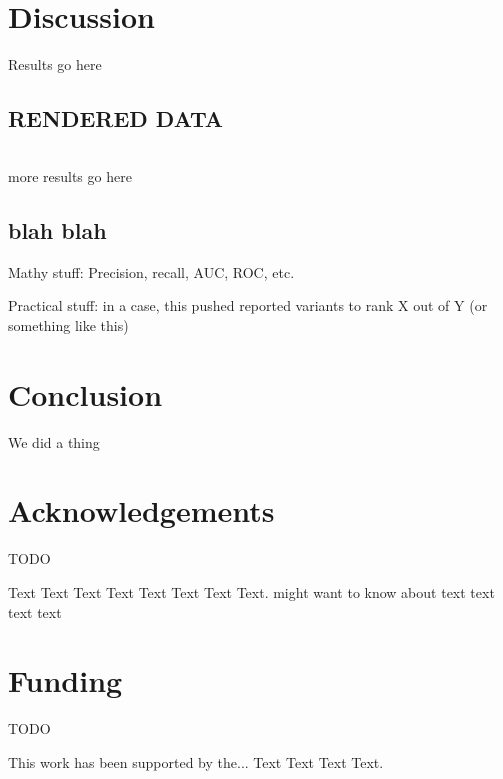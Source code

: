 \documentclass{bioinfo}
\begin{document}
\section{Discussion}
Results go here

\subsection{RENDERED DATA}
\begin{table*}
\centering
\begin{tabular}{c|c|c|c|c||c|c|c|c}

\end{tabular}
\end{table*}

more results go here

\subsection{blah blah}
Mathy stuff: Precision, recall, AUC, ROC, etc.

Practical stuff: in a case, this pushed reported variants to rank X out of Y (or something like this)

\section{Conclusion}

We did a thing

\section*{Acknowledgements}
TODO

Text Text Text Text Text Text  Text Text.  \citealp{Boffelli03} might want to know about  text
text text text\vspace*{-12pt}

\section*{Funding}
TODO

This work has been supported by the... Text Text  Text Text.\vspace*{-12pt}

%
%
%
%
%
%
%
%
%
\end{document}
